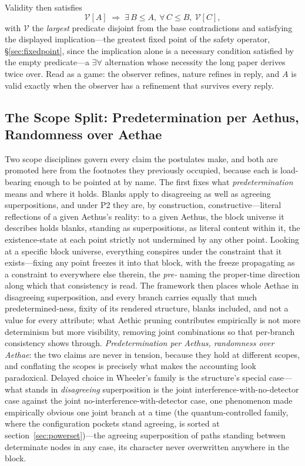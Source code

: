 \documentclass[11pt]{article}
\theoremstyle{definition}
\newcommand{\Aethus}{Aethus}
\begin{document}
\begin{itemize}
Validity then satisfies
\begin{equation*}
\mathcal{V}[A] \;\Longrightarrow\; \exists\, B \le A,\ \forall\, C \le B,\ \mathcal{V}[C],
\end{equation*}
with $\mathcal{V}$ the \emph{largest} predicate disjoint from the base contradictions and satisfying the displayed implication---the greatest fixed point of the safety operator, \S\ref{sec:fixedpoint}, since the implication alone is a necessary condition satisfied by the empty predicate---a $\exists\forall$ alternation whose necessity the long paper derives twice over. Read as a game: the observer refines, nature refines in reply, and $A$ is valid exactly when the observer has a refinement that survives every reply.
\end{itemize}

\subsection{The Scope Split: Predetermination per \Aethus{}, Randomness over Aethae}\label{sec:scope}

Two scope disciplines govern every claim the postulates make, and both are promoted here from the footnotes they previously occupied, because each is load-bearing enough to be pointed at by name. The first fixes what \emph{predetermination} means and where it holds. Blanks apply to disagreeing as well as agreeing superpositions, and under P2 they are, by construction, constructive---literal reflections of a given \Aethus{}'s reality: to a given \Aethus{}, the block universe it describes holds blanks, standing as superpositions, as literal content within it, the existence-state at each point strictly not undermined by any other point. Looking at a specific block universe, everything conspires under the constraint that it exists---fixing any point freezes it into that block, with the freeze propagating as a constraint to everywhere else therein, the \textit{pre-} naming the proper-time direction along which that consistency is read. The framework then places whole Aethae in disagreeing superposition, and every branch carries equally that much predetermined-ness, fixity of its rendered structure, blanks included, and not a value for every attribute; what Aethic pruning contributes empirically is not more determinism but more visibility, removing joint combinations so that per-branch consistency shows through. \emph{Predetermination per \Aethus{}, randomness over Aethae}: the two claims are never in tension, because they hold at different scopes, and conflating the scopes is precisely what makes the accounting look paradoxical. Delayed choice in Wheeler's family is the structure's special case---what stands in \emph{disagreeing} superposition is the joint interference-with-no-detector case against the joint no-interference-with-detector case, one phenomenon made empirically obvious one joint branch at a time (the quantum-controlled family, where the configuration pockets stand agreeing, is sorted at section~\ref{sec:powerset})---the agreeing superposition of paths standing between determinate nodes in any case, its character never overwritten anywhere in the block.
\end{document}

